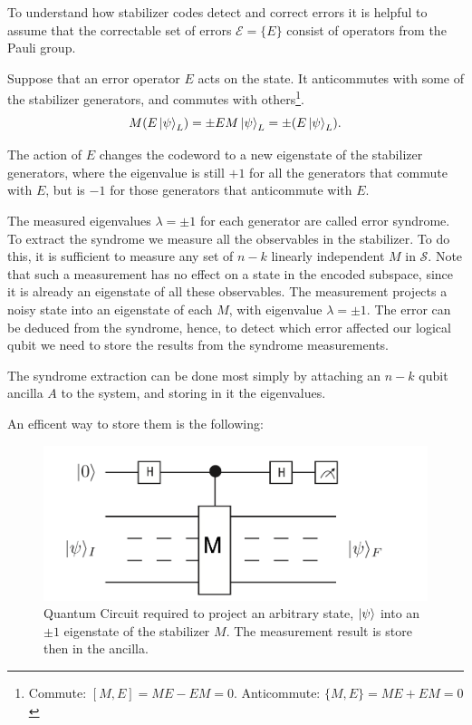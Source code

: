 To understand how stabilizer codes detect and correct errors it is helpful to assume that the correctable set of errors $\mathcal{E}=\{E\}$ consist of operators from the Pauli group. 



Suppose that an error operator $E$ acts on the state. It anticommutes with some of the stabilizer generators, and commutes with others\footnote{Commute: $[M,E] = ME-EM = 0 $.
Anticommute: $\{M,E\}=ME+EM=0$}.
\begin{equation}
    M(E\ket{\psi}_L) = \pm EM\ket{\psi}_L = \pm (E\ket{\psi}_L).
    \label{eq:stabcond}
\end{equation}

The action of $E$ changes the codeword to a new eigenstate of the stabilizer generators, where the eigenvalue is still $+1$ for all the generators that commute with $E$, but is $-1$ for those generators that anticommute with $E$.

The measured eigenvalues $\lambda=\pm 1$ for each generator are called error syndrome.
To extract the syndrome we measure all the observables in the stabilizer. To do this, it is sufficient to measure any set of $n-k$ linearly independent $M$ in $\mathcal{S}$. Note that such a measurement has no effect on a state in the encoded subspace, since it is already an eigenstate of all these observables. 
The measurement projects a noisy state into an eigenstate of each $M$, with eigenvalue $\lambda=\pm 1$.
The error can be deduced from the syndrome, hence, to detect which error affected our logical qubit we need to store the results from the syndrome measurements. 

The syndrome extraction can be done most simply by attaching an $n-k$ qubit ancilla $A$ to the system, and storing in it the eigenvalues. 

An efficent way to store them is the following:
\begin{figure}[h!]
    \centering
    \includegraphics[scale=0.5]{Mainmatter/images/Syndrome_measurement_stabilizer_code.png}
    \caption{Quantum Circuit required to project an arbitrary state, $\ket{\psi}$ into an $\pm 1$ eigenstate of the stabilizer $M$. The measurement result is store then in the ancilla.}
    \label{fig:Syndrome}
\end{figure}


